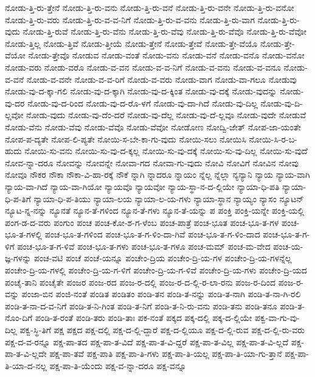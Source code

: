 {ನೋಡು-ತ್ತಿ-ರು-ತ್ತೇನೆ
ನೋಡು-ತ್ತಿ-ರು-ವನು
ನೋಡು-ತ್ತಿ-ರು-ವನೆ
ನೋಡು-ತ್ತಿ-ರು-ವನೇ
ನೋಡು-ತ್ತಿ-ರು-ವನೋ
ನೋಡು-ತ್ತಿ-ರು-ವರು
ನೋಡು-ತ್ತಿ-ರು-ವ-ವ-ನಿಗೆ
ನೋಡು-ತ್ತಿ-ರು-ವ-ವನು
ನೋಡು-ತ್ತಿ-ರು-ವಾಗ
ನೋಡು-ತ್ತಿ-ರು-ವುದು
ನೋಡು-ತ್ತಿ-ರುವೆ
ನೋಡು-ತ್ತಿ-ರು-ವೆನು
ನೋಡು-ತ್ತಿ-ರು-ವೆವು
ನೋಡು-ತ್ತಿ-ರು-ವೆವೊ
ನೋಡು-ತ್ತಿ-ರು-ವೆವೋ
ನೋಡು-ತ್ತಿಲ್ಲ
ನೋಡು-ತ್ತಿವೆ
ನೋಡು-ತ್ತೀಯೆ
ನೋಡು-ತ್ತೇನೆ
ನೋಡು-ತ್ತೇವೆ
ನೋಡು-ತ್ತೇ-ವೆಯೊ
ನೋಡು-ತ್ತೇ-ವೆಯೋ
ನೋಡು-ತ್ತೇವೊ
ನೋಡುವ
ನೋಡು-ವಂತೆ
ನೋಡು-ವನು
ನೋಡು-ವನೆ
ನೋಡು-ವನೊ
ನೋಡು-ವನೋ
ನೋಡು-ವರು
ನೋಡು-ವರೊ
ನೋಡು-ವ-ವನ
ನೋಡು-ವ-ವ-ನಿಗೆ
ನೋಡು-ವ-ವನು
ನೋಡು-ವ-ವನೂ
ನೋಡು-ವ-ವನೆ
ನೋಡು-ವ-ವನೇ
ನೋಡು-ವ-ವ-ರಿಗೆ
ನೋಡು-ವ-ವರು
ನೋಡು-ವಾಗ
ನೋಡು-ವಾ-ಗಲೂ
ನೋಡುವು
ನೋಡು-ವು-ದ-ಕ್ಕಾ-ಗಲಿ
ನೋಡು-ವು-ದ-ಕ್ಕಾಗಿ
ನೋಡು-ವು-ದ-ಕ್ಕಿಂತ
ನೋಡು-ವು-ದಕ್ಕೆ
ನೋಡು-ವುದನ್ನು
ನೋಡು-ವು-ದರ
ನೋಡು-ವು-ದ-ರಿಂದ
ನೋಡು-ವು-ದ-ರೊ-ಳಗೆ
ನೋಡು-ವು-ದಾ-ಗಿದೆ
ನೋಡು-ವು-ದಿಲ್ಲ
ನೋಡು-ವು-ದಿ-ಲ್ಲವೋ
ನೋಡು-ವುದು
ನೋಡು-ವು-ದೆಂ-ದರೆ
ನೋಡು-ವು-ದೆಲ್ಲ
ನೋಡು-ವು-ದೆ-ಲ್ಲವೂ
ನೋಡು-ವುದೇ
ನೋಡುವೆ
ನೋಡು-ವೆನು
ನೋಡು-ವೆವು
ನೋಡು-ವೆವೊ
ನೋಡು-ವೆವೋ
ನೋಡೋಣ
ನೋದ್ವಿ-ಜೇತ್
ನೋಪ-ಜಾ-ಯಂತೇ
ನೋಪ-ಪ-ದ್ಯತೇ
ನೋಪ-ಲಿ-ಪ್ಯತೇ
ನೋಯಿ-ಸ-ಬೇ-ಕಾ-ಗು-ವುದು
ನೋಯಿ-ಸಲು
ನೋಯಿಸಿ
ನೋಯಿ-ಸಿ-ರ-ಬ-ಹುದು
ನೋಯಿ-ಸು-ವನು
ನೋಯಿ-ಸು-ವು-ದ-ಕ್ಕಲ್ಲ
ನೋಯಿ-ಸು-ವು-ದಕ್ಕೆ
ನೋಯಿ-ಸು-ವು-ದಿಲ್ಲ
ನೋಯಿ-ಸು-ವುದೆ
ನೋವ-ನ್ನಾ-ದರೂ
ನೋವನ್ನು
ನೋವನ್ನೇ
ನೋವಾ-ಗದ
ನೋವಾ-ಗು-ವುದು
ನೋವಿ
ನೋವಿಗೆ
ನೋವಿನ
ನೋವು
ನೋವೂ
ನೌಕರ
ನೌಕಾ
ನೌಕಾ-ವಿ-ಹಾ-ರಕ್ಕೆ
ನೌಕೆ
ನ್ನಾಗಿ
ನ್ನಾದರೂ
ನ್ನಾಯಂ
ನ್ನೆಲ್ಲ
ನ್ನೆಲ್ಲಾ
ನ್ಯನ್ಯಾನಿ
ನ್ಯಾಯ
ನ್ಯಾಯ-ವಾಗಿ
ನ್ಯಾಯ-ವಾ-ಗಿದೆ
ನ್ಯಾಯ-ವಾ-ಗಿಯೋ
ನ್ಯಾಯವೊ
ನ್ಯಾಯವೋ
ನ್ಯಾಯ-ಸ್ಥಾ-ನ-ದ-ಲ್ಲಿಯೇ
ನ್ಯಾಯಾ-ಧಿ-ಪತಿ
ನ್ಯಾಯಾ-ಧಿ-ಪ-ತಿಗೆ
ನ್ಯಾಯಾ-ಧಿ-ಪ-ತಿಯು
ನ್ಯಾಯಾ-ಲಯ
ನ್ಯಾಯಾ-ಲ-ಯ-ಗಳು
ನ್ಯಾಯಾ-ಸ್ಥಾನ
ನ್ಯಾಯ್ಯಂ
ನ್ಯಾಸಂ
ನ್ಯೂಟನ್
ನ್ಯೂಟ-ನ್ನ-ನನ್ನು
ನ್ಯೂನತೆ
ನ್ಯೂನ-ತೆ-ಗಳಿಂದ
ನ್ಯೂನ-ತೆ-ಗಳು
ನ್ಯೂನ-ತೆ-ಯನ್ನು
ಪ
ಪಂಕ್ತಿ
ಪಂಕ್ತಿ-ಯನ್ನೇ
ಪಂಕ್ತಿ-ಯಲ್ಲಿ
ಪಂಗ-ಡ-ದ-ವರು
ಪಂಗುಂ
ಪಂಚ
ಪಂಚ-ಕೋ-ಶ-ಗ-ಳೆಂಬ
ಪಂಚ-ಪಾತ್ರೆ
ಪಂಚ-ಭೂತ
ಪಂಚ-ಭೂ-ತ-ಗಳ
ಪಂಚ-ಭೂ-ತ-ಗಳಲ್ಲಿ
ಪಂಚ-ಭೂ-ತ-ಗಳಿಂದ
ಪಂಚ-ಭೂ-ತ-ಗ-ಳಿಂ-ದಾ-ಗಿವೆ
ಪಂಚ-ಭೂ-ತ-ಗ-ಳಿಂ-ದಾದ
ಪಂಚ-ಭೂ-ತ-ಗ-ಳಿಗೆ
ಪಂಚ-ಭೂ-ತ-ಗ-ಳಿವೆ
ಪಂಚ-ಭೂ-ತ-ಗಳು
ಪಂಚ-ಭೂ-ತ-ಗಳೂ
ಪಂಚ-ಮಮ್
ಪಂಚ-ಮ-ವೇದ
ಪಂಚ-ಯ-ಜ್ಞ-ಗಳನ್ನು
ಪಂಚ-ವಟಿ
ಪಂಚೆ
ಪಂಚೆ-ಯನ್ನೂ
ಪಂಚೇಂ-ದ್ರಿಯ
ಪಂಚೇಂ-ದ್ರಿ-ಯ-ಗಳ
ಪಂಚೇಂ-ದ್ರಿ-ಯ-ಗಳನ್ನೆಲ್ಲ
ಪಂಚೇಂ-ದ್ರಿ-ಯ-ಗಳಲ್ಲಿ
ಪಂಚೇಂ-ದ್ರಿ-ಯ-ಗ-ಳಿಗೆ
ಪಂಚೇಂ-ದ್ರಿ-ಯ-ಗ-ಳಿವೆ
ಪಂಚೇಂ-ದ್ರಿ-ಯ-ಗಳು
ಪಂಚೇಂ-ದ್ರಿ-ಯದ
ಪಂಚೈ-ತಾನಿ
ಪಂಚೈತೇ
ಪಂಜರ
ಪಂಜ-ರದ
ಪಂಜ-ರ-ದಲ್ಲಿ
ಪಂಜ-ರ-ದ-ಲ್ಲಿ-ರ-ಲಾ-ರನು
ಪಂಜ-ರ-ದಿಂದ
ಪಂಜ-ರ-ವನ್ನು
ಪಂಜಾ-ಬಿನ
ಪಂಜಿ-ನಂತೆ
ಪಂಡಿತ
ಪಂಡಿತಂ
ಪಂಡಿ-ತನ
ಪಂಡಿ-ತ-ನನ್ನು
ಪಂಡಿ-ತ-ನಾಗಿ
ಪಂಡಿ-ತ-ನಾ-ಗಿ-ರಲಿ
ಪಂಡಿ-ತ-ನಾ-ದ-ವ-ನಿಗೆ
ಪಂಡಿ-ತ-ನಿ-ಗಿಂತ
ಪಂಡಿ-ತ-ನಿಗೆ
ಪಂಡಿ-ತ-ನಿ-ರು-ವನು
ಪಂಡಿ-ತನು
ಪಂಡಿ-ತನೂ
ಪಂಡಿ-ತ-ನೊಂ-ದಿಗೆ
ಪಂಡಿ-ತ-ರಂತೆ
ಪಂಡಿ-ತರು
ಪಂಡಿ-ತಾಃ
ಪಕ-ನಂತೆ
ಪಕ್ಕದ
ಪಕ್ಕ-ದಲ್ಲಿ
ಪಕ್ಕ-ದ-ಲ್ಲಿಯೇ
ಪಕ್ವ-ವಾ-ಗು-ವು-ದಿಲ್ಲ
ಪಕ್ವ-ಸ್ಥಿ-ತಿಗೆ
ಪಕ್ಷ
ಪಕ್ಷದ
ಪಕ್ಷ-ದಲ್ಲಿ
ಪಕ್ಷ-ದ-ಲ್ಲಿ-ದ್ದಾರೆ
ಪಕ್ಷ-ದ-ಲ್ಲಿಯೂ
ಪಕ್ಷ-ದ-ಲ್ಲಿ-ರುವ
ಪಕ್ಷ-ದ-ಲ್ಲಿ-ರು-ವರು
ಪಕ್ಷ-ದ-ವ-ರನ್ನೂ
ಪಕ್ಷ-ಪಾ-ತದ
ಪಕ್ಷ-ಪಾ-ತ-ವಿದೆ
ಪಕ್ಷ-ಪಾ-ತ-ವಿ-ದ್ದರೆ
ಪಕ್ಷ-ಪಾ-ತ-ವಿಲ್ಲ
ಪಕ್ಷ-ಪಾ-ತ-ವಿ-ಲ್ಲದೆ
ಪಕ್ಷ-ಪಾ-ತ-ವಿ-ಲ್ಲದೇ
ಪಕ್ಷ-ಪಾ-ತವೆ
ಪಕ್ಷ-ಪಾತಿ
ಪಕ್ಷ-ಪಾ-ತಿ-ಗಳು
ಪಕ್ಷ-ಪಾ-ತಿ-ಯಲ್ಲ
ಪಕ್ಷ-ಪಾ-ತಿ-ಯಾ-ಗು-ತ್ತಾನೆ
ಪಕ್ಷ-ಪಾ-ತಿ-ಯಾ-ದ-ನಲ್ಲ
ಪಕ್ಷ-ಪಾ-ತಿ-ಯೆಂದು
ಪಕ್ಷ-ವ-ನ್ನಾ-ದರೂ
ಪಕ್ಷ-ವನ್ನೂ
}
